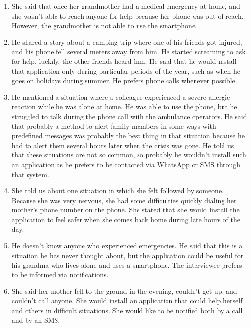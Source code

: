 \documentclass[12pt]{article}
\begin{document}
\begin{enumerate}
    \item She said that once her grandmother had a medical emergency at 
    home, and she wasn't able to reach anyone for help because her phone 
    was out of reach. However, the grandmother is not able to use the 
    smartphone.
    
    \item He shared a story about a camping trip where one of his friends got 
    injured, and his phone fell several meters away from him. He started screaming 
    to ask for help, luckily, the other friends heard him. He said that he would 
    install that application only during particular periods of the year, such as when 
    he goes on holidays during summer. He prefers phone calls whenever possible.
    
    \item He mentioned a situation where a colleague experienced a severe allergic 
    reaction while he was alone at home. He was able to use the phone, but he 
    struggled to talk during the phone call with the ambulance operators. He said 
    that probably a method to alert family members in some ways with predefined 
    messages was probably the best thing in that situation because he had to alert 
    them several hours later when the crisis was gone. He told us that these 
    situations are not so common, so probably he wouldn't install such an application 
    as he prefers to be contacted via WhatsApp or SMS through that system.
    
    \item She told us about one situation in which she felt followed by someone. 
    Because she was very nervous, she had some difficulties quickly dialing her 
    mother's phone number on the phone. She stated that she would install the 
    application to feel safer when she comes back home during late hours of the day.
    
    \item He doesn't know anyone who experienced emergencies. He said that this is a 
    situation he has never thought about, but the application could be useful for his 
    grandma who lives alone and uses a smartphone. The interviewee prefers to be 
    informed via notifications.

    \item She said her mother fell to the ground in the evening, couldn't 
    get up, and couldn't call anyone. She would install an application that 
    could help herself and others in difficult situations. She 
    would like to be notified both by a call and by an SMS.
    

\end{enumerate}
\end{document}
